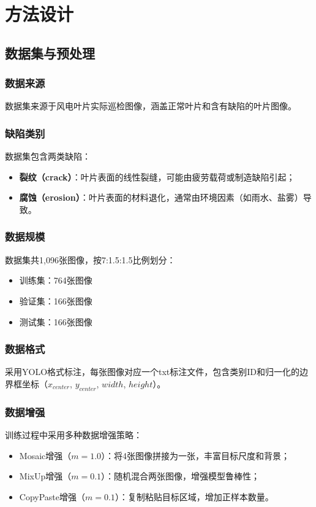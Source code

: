\documentclass[12pt,a4paper]{article}
\begin{document}
\section{方法设计}

\subsection{数据集与预处理}

\subsubsection{数据来源}
数据集来源于风电叶片实际巡检图像，涵盖正常叶片和含有缺陷的叶片图像。

\subsubsection{缺陷类别}
数据集包含两类缺陷：
\begin{itemize}[noitemsep]
  \item \textbf{裂纹（crack）}：叶片表面的线性裂缝，可能由疲劳载荷或制造缺陷引起；
  \item \textbf{腐蚀（erosion）}：叶片表面的材料退化，通常由环境因素（如雨水、盐雾）导致。
\end{itemize}

\subsubsection{数据规模}
数据集共1,096张图像，按7:1.5:1.5比例划分：
\begin{itemize}[noitemsep]
  \item 训练集：764张图像
  \item 验证集：166张图像
  \item 测试集：166张图像
\end{itemize}

\subsubsection{数据格式}
采用YOLO格式标注，每张图像对应一个txt标注文件，包含类别ID和归一化的边界框坐标（$x_{center}$, $y_{center}$, $width$, $height$）。

\subsubsection{数据增强}
训练过程中采用多种数据增强策略：
\begin{itemize}[noitemsep]
  \item Mosaic增强（$m=1.0$）：将4张图像拼接为一张，丰富目标尺度和背景；
  \item MixUp增强（$m=0.1$）：随机混合两张图像，增强模型鲁棒性；
  \item CopyPaste增强（$m=0.1$）：复制粘贴目标区域，增加正样本数量。
\end{itemize}
\end{document}
